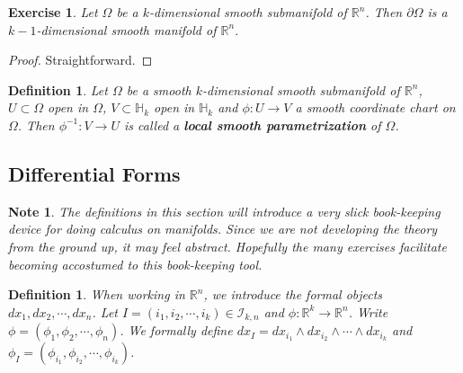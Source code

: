 \documentclass[12pt]{amsart}
\newtheorem{defn}[thm]{Definition}
\newtheorem{note}[thm]{Note}
\newtheorem{ex}[thm]{Exercise}
\newcommand{\Om}{\Omega}
\renewcommand{\H}{\mathbb{H}}
\newcommand{\R}{\mathbb{R}}
\newcommand{\MI}{\mathcal{I}}
\begin{document}
	\begin{ex}
		Let $\Om$ be a $k$-dimensional smooth submanifold of $\R^n$. Then $\partial \Om$ is a $k-1$-dimensional smooth manifold of $\R^n$.
	\end{ex}
	
	\begin{proof}
		Straightforward.
	\end{proof}
	
	\begin{defn}
		Let $\Om$ be a smooth $k$-dimensional smooth submanifold of $\R^n$, $U \subset \Om$ open in $\Om$, $V \subset \H_k$ open in $\H_k$ and $\phi: U \rightarrow V$ a smooth coordinate chart on $\Om$. Then $\phi^{-1}: V \rightarrow U$ is called a \textbf{local smooth parametrization} of $\Om$. 
	\end{defn}
	
	\subsection{Differential Forms}
	
	\begin{note}
		The definitions in this section will introduce a very slick book-keeping device for doing calculus on manifolds. Since we are not developing the theory from the ground up, it may feel abstract. Hopefully the many exercises facilitate becoming accostumed to this book-keeping tool.
	\end{note}
	
	\begin{defn}
		When working in $\R^n$, we introduce the formal objects $dx_1, dx_2, \cdots, dx_n$. Let $I = (i_1, i_2, \cdots, i_k)\in \MI_{k,n}$ and $\phi: \R^k \rightarrow \R^n$. Write $\phi = (\phi_1, \phi_2, \cdots, \phi_n)$. We formally define $dx_I = dx_{i_1}\wedge dx_{i_2} \wedge \cdots \wedge dx_{i_k}$ and $\phi_I = (\phi_{i_1}, \phi_{i_2}, \cdots, \phi_{i_k})$.   
	\end{defn}
	
\end{document}
